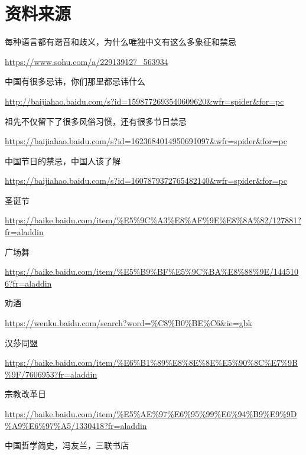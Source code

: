 \chapter{资料来源}
\setlength\parindent{0em}
\cnprolight
\par
每种语言都有谐音和歧义，为什么唯独中文有这么多象征和禁忌 

\url{https://www.sohu.com/a/229139127_563934} 

中国有很多忌讳，你们那里都忌讳什么 

\url{http://baijiahao.baidu.com/s?id=1598772693540609620&wfr=spider&for=pc }

祖先不仅留下了很多风俗习惯，还有很多节日禁忌 

\url{https://baijiahao.baidu.com/s?id=1623684014950691097&wfr=spider&for=pc} 

中国节日的禁忌，中国人该了解 

\url{https://baijiahao.baidu.com/s?id=1607879372765482140&wfr=spider&for=pc}

圣诞节

\url{https://baike.baidu.com/item/%E5%9C%A3%E8%AF%9E%E8%8A%82/127881?fr=aladdin}

广场舞

\url{https://baike.baidu.com/item/%E5%B9%BF%E5%9C%BA%E8%88%9E/1445106?fr=aladdin}

劝酒

\url{https://wenku.baidu.com/search?word=%C8%B0%BE%C6&ie=gbk}

汉莎同盟

\url{https://baike.baidu.com/item/%E6%B1%89%E8%8E%8E%E5%90%8C%E7%9B%9F/7606953?fr=aladdin}

宗教改革日

\url{https://baike.baidu.com/item/%E5%AE%97%E6%95%99%E6%94%B9%E9%9D%A9%E6%97%A5/1330418?fr=aladdin}

中国哲学简史，冯友兰，三联书店

